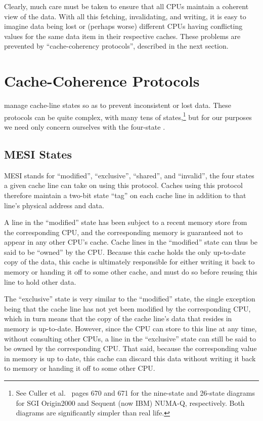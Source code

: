 Clearly, much care must be taken to ensure that all CPUs maintain
a coherent view of the data.
With all this fetching, invalidating, and writing, it is easy to
imagine data being lost or (perhaps worse) different CPUs having
conflicting values for the same data item in their respective
caches.
These problems are prevented by ``cache-coherency protocols'',
described in the next section.

\section{Cache-Coherence Protocols}
\label{sec:app:whymb:Cache-Coherence Protocols}

 manage cache-line states so as to prevent
inconsistent or lost data.
These protocols can be quite complex, with many tens
of states,\footnote{
	See Culler et al.~\cite{DavidECuller1999} pages 670 and 671
	for the nine-state and 26-state diagrams for SGI Origin2000
	and Sequent (now IBM) NUMA-Q, respectively.
	Both diagrams are significantly simpler than real life.}
but for our purposes we need only concern ourselves with the
four-state .

\subsection{MESI States}
\label{sec:app:whymb:MESI States}

MESI stands for ``modified'', ``exclusive'', ``shared'', and ``invalid'',
the four states a given cache line can take on using this
protocol.
Caches using this protocol therefore maintain a two-bit state ``tag'' on each
cache line in addition to that line's physical address and data.

A line in the ``modified'' state has been subject to a recent memory store
from the corresponding CPU, and the corresponding memory is guaranteed
not to appear in any other CPU's cache.
Cache lines in the ``modified'' state can thus be said to be ``owned''
by the CPU\@.
Because this cache holds the only up-to-date copy of the data, this
cache is ultimately responsible for either writing it back to memory
or handing it off to some other cache, and must do so before reusing
this line to hold other data.

The ``exclusive'' state is very similar to the ``modified'' state,
the single exception being that the cache line has not yet been
modified by the corresponding CPU, which in turn means that the
copy of the cache line's data that resides in memory is up-to-date.
However, since the CPU can store to this line at any time, without
consulting other CPUs, a line in the ``exclusive'' state can still
be said to be owned by the corresponding CPU\@.
That said, because the corresponding value in memory is up to date,
this cache can discard this data without writing it back to memory
or handing it off to some other CPU\@.

